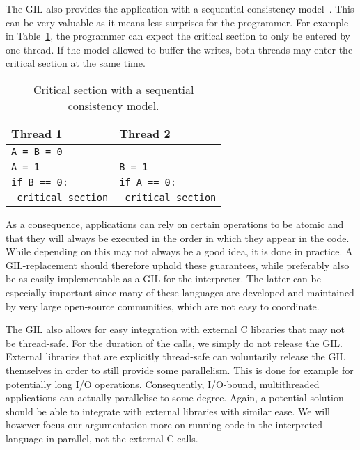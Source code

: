 \documentclass{sigplanconf}
\begin{document}
The GIL also provides the application with a sequential consistency
model~\cite{lamport79}. This can be very valuable as it means less
surprises for the programmer. For example in Table~\ref{tab:seq_cons},
the programmer can expect the critical section to only be entered by
one thread.  If the model allowed to buffer the writes, both threads
may enter the critical section at the same time.

\begin{table}[!ht]
  \begin{center}
    \begin{tabular}{|l|l|}
      \hline
      Thread 1                      & Thread 2                      \\
      \hline
      \multicolumn{2}{|l|}{\texttt{A = B = 0}}                      \\
      \hline
      \texttt{A = 1}                & \texttt{B = 1}                \\
      \texttt{if B == 0:}           & \texttt{if A == 0:}           \\
      \texttt{    critical section} & \texttt{    critical section} \\
      \hline
    \end{tabular}
    \caption{Critical section with a sequential consistency model.}
    \label{tab:seq_cons}
  \end{center}
\end{table}

As a consequence, applications can rely on certain operations to be
atomic and that they will always be executed in the order in which
they appear in the code. While depending on this may not always be a
good idea, it is done in practice. A GIL-replacement should therefore
uphold these guarantees, while preferably also be as easily
implementable as a GIL for the interpreter. The latter can be
especially important since many of these languages are developed and
maintained by very large open-source communities, which are not easy
to coordinate.

The GIL also allows for easy integration with external C libraries that
may not be thread-safe. For the duration of the calls, we
simply do not release the GIL. External libraries that are explicitly
thread-safe can voluntarily release the GIL themselves in order to
still provide some parallelism. This is done for example for
potentially long I/O operations. Consequently, I/O-bound,
multithreaded applications can actually parallelise to some
degree. Again, a potential solution should be able to integrate with
external libraries with similar ease. We will however focus our
argumentation more on running code in the interpreted language in
parallel, not the external C calls.
\end{document}
